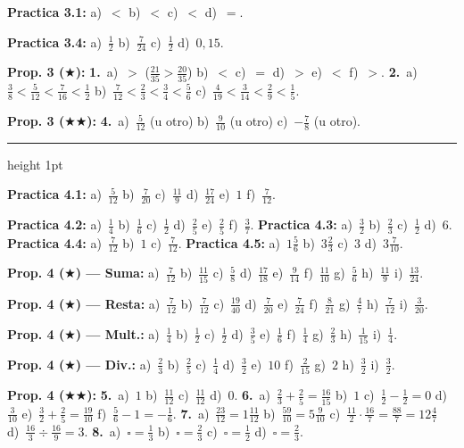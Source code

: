 \documentclass[11pt, letterpaper]{article}
\newcommand{\subbloque}[1]{%
  \vspace{14pt}
  \noindent{\large\bfseries\color{zenitnavy} #1}\par
  \vspace{4pt}\hrule height 1pt\vspace{8pt}}
\begin{document}
\textbf{Practica 3.1:} a)~$<$ \; b)~$<$ \; c)~$<$ \; d)~$=$.

\textbf{Practica 3.4:} a)~$\tfrac{1}{2}$ \; b)~$\tfrac{7}{24}$ \; c)~$\tfrac{1}{2}$ \; d)~$0{,}15$.

\textbf{Prop. 3 ($\bigstar$):} \textbf{1.}~a)~$>$ ($\tfrac{21}{35}>\tfrac{20}{35}$) b)~$<$ c)~$=$ d)~$>$ e)~$<$ f)~$>$. \quad \textbf{2.}~a)~$\tfrac{3}{8}<\tfrac{5}{12}<\tfrac{7}{16}<\tfrac{1}{2}$ \; b)~$\tfrac{7}{12}<\tfrac{2}{3}<\tfrac{3}{4}<\tfrac{5}{6}$ \; c)~$\tfrac{4}{19}<\tfrac{3}{14}<\tfrac{2}{9}<\tfrac{1}{5}$.

\textbf{Prop. 3 ($\bigstar\bigstar$):} \textbf{4.}~a)~$\tfrac{5}{12}$ (u otro) b)~$\tfrac{9}{10}$ (u otro) c)~$-\tfrac{7}{8}$ (u otro).

\subbloque{Secci\'on 4 --- Operaciones}

\textbf{Practica 4.1:} a)~$\tfrac{5}{12}$ \; b)~$\tfrac{7}{20}$ \; c)~$\tfrac{11}{9}$ \; d)~$\tfrac{17}{24}$ \; e)~$1$ \; f)~$\tfrac{7}{12}$.

\textbf{Practica 4.2:} a)~$\tfrac{1}{4}$ b)~$\tfrac{1}{6}$ c)~$\tfrac{1}{2}$ d)~$\tfrac{2}{5}$ e)~$\tfrac{2}{5}$ f)~$\tfrac{3}{7}$. \quad \textbf{Practica 4.3:} a)~$\tfrac{3}{2}$ b)~$\tfrac{2}{3}$ c)~$\tfrac{1}{2}$ d)~$6$. \quad \textbf{Practica 4.4:} a)~$\tfrac{7}{12}$ b)~$1$ c)~$\tfrac{7}{12}$. \quad \textbf{Practica 4.5:} a)~$1\tfrac{5}{6}$ b)~$3\tfrac{2}{3}$ c)~$3$ d)~$3\tfrac{7}{10}$.

\textbf{Prop. 4 ($\bigstar$) --- Suma:} a)~$\tfrac{7}{12}$ b)~$\tfrac{11}{15}$ c)~$\tfrac{5}{8}$ d)~$\tfrac{17}{18}$ e)~$\tfrac{9}{14}$ f)~$\tfrac{11}{10}$ g)~$\tfrac{5}{6}$ h)~$\tfrac{11}{9}$ i)~$\tfrac{13}{24}$.

\textbf{Prop. 4 ($\bigstar$) --- Resta:} a)~$\tfrac{7}{12}$ b)~$\tfrac{7}{12}$ c)~$\tfrac{19}{40}$ d)~$\tfrac{7}{20}$ e)~$\tfrac{7}{24}$ f)~$\tfrac{8}{21}$ g)~$\tfrac{4}{7}$ h)~$\tfrac{7}{12}$ i)~$\tfrac{3}{20}$.

\textbf{Prop. 4 ($\bigstar$) --- Mult.:} a)~$\tfrac{1}{4}$ b)~$\tfrac{1}{2}$ c)~$\tfrac{1}{2}$ d)~$\tfrac{3}{5}$ e)~$\tfrac{1}{6}$ f)~$\tfrac{1}{4}$ g)~$\tfrac{2}{3}$ h)~$\tfrac{1}{15}$ i)~$\tfrac{1}{4}$.

\textbf{Prop. 4 ($\bigstar$) --- Div.:} a)~$\tfrac{2}{3}$ b)~$\tfrac{2}{5}$ c)~$\tfrac{1}{4}$ d)~$\tfrac{3}{2}$ e)~$10$ f)~$\tfrac{2}{15}$ g)~$2$ h)~$\tfrac{3}{2}$ i)~$\tfrac{3}{2}$.

\textbf{Prop. 4 ($\bigstar\bigstar$):} \textbf{5.}~a)~$1$ b)~$\tfrac{11}{12}$ c)~$\tfrac{11}{12}$ d)~$0$. \quad \textbf{6.}~a)~$\tfrac{2}{3}+\tfrac{2}{5}=\tfrac{16}{15}$ b)~$1$ c)~$\tfrac{1}{2}-\tfrac{1}{2}=0$ d)~$\tfrac{3}{10}$ e)~$\tfrac{3}{2}+\tfrac{2}{5}=\tfrac{19}{10}$ f)~$\tfrac{5}{6}-1=-\tfrac{1}{6}$. \quad \textbf{7.}~a)~$\tfrac{23}{12}=1\tfrac{11}{12}$ b)~$\tfrac{59}{10}=5\tfrac{9}{10}$ c)~$\tfrac{11}{2}\cdot\tfrac{16}{7}=\tfrac{88}{7}=12\tfrac{4}{7}$ d)~$\tfrac{16}{3}\div\tfrac{16}{9}=3$. \quad \textbf{8.}~a)~$\square=\tfrac{1}{3}$ b)~$\square=\tfrac{2}{3}$ c)~$\square=\tfrac{1}{2}$ d)~$\square=\tfrac{2}{3}$.
\end{document}
